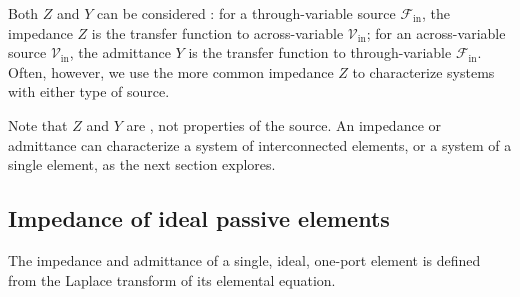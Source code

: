 \documentclass[dynamic_systems.tex]{subfiles}
\begin{document}
Both $Z$ and $Y$ can be considered : for a through-variable source $\mathcal{F}_\text{in}$, the impedance $Z$ is the transfer function to across-variable $\mathcal{V}_\text{in}$; for an across-variable source $\mathcal{V}_\text{in}$, the admittance $Y$ is the transfer function to through-variable $\mathcal{F}_\text{in}$.
Often, however, we use the more common impedance $Z$ to characterize systems with either type of source.
\tags{}

Note that $Z$ and $Y$ are , not properties of the source.
An impedance or admittance can characterize a system of interconnected elements, or a system of a single element, as the next section explores.
\tags{}

\subsection{Impedance of ideal passive elements}
\tags{}

The impedance and admittance of a single, ideal, one-port element is defined from the Laplace transform of its elemental equation.
\tags{}
\end{document}
